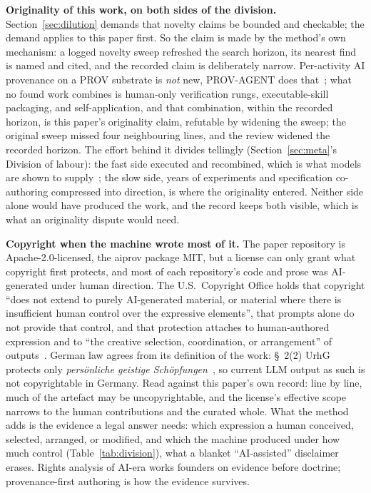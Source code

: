 \textbf{Originality of this work, on both sides of the division.}
Section~\ref{sec:dilution} demands that novelty claims be bounded and
checkable; the demand applies to this paper first. So the claim is
made by the method's own mechanism: a logged novelty sweep refreshed
the search horizon, its nearest find is named and cited, and the
recorded claim is deliberately narrow. Per-activity AI provenance on
a PROV substrate is \emph{not} new, PROV-AGENT does
that~\cite{prov-agent2025}; what no found work combines is human-only
verification rungs, executable-skill packaging, and self-application,
and that combination, within the recorded horizon, is this paper's
originality claim, refutable by widening the sweep; the original sweep
missed four neighbouring lines, and the review widened the recorded horizon.
The effort behind it divides tellingly (Section~\ref{sec:meta}'s
Division of labour): the fast side executed and recombined, which is
what models are shown to supply~\cite{llm-homogenization2024}; the
slow side, years of experiments and specification co-authoring
compressed into direction, is where the originality entered. Neither
side alone would have produced the work, and the record keeps both
visible, which is what an originality dispute would need.

\textbf{Copyright when the machine wrote most of it.} The paper
repository is Apache-2.0-licensed, the aiprov package MIT, but a
license can only grant what copyright first protects, and most of
each repository's code and prose was AI-generated under human
direction. The U.S.\ Copyright Office holds that copyright ``does not
extend to purely AI-generated material, or material where there is
insufficient human control over the expressive elements'', that
prompts alone do not provide that control, and that protection
attaches to human-authored expression and to ``the creative
selection, coordination, or arrangement'' of
outputs~\cite{usco-ai-copyrightability2025}. German law agrees from
its definition of the work: \S~2(2) UrhG protects only
\emph{pers\"onliche geistige Sch\"opfungen}~\cite{urhg-para2}, so
current LLM output as such is not copyrightable in Germany. Read
against this paper's own record: line by line, much of the artefact
may be uncopyrightable, and the license's effective scope narrows to
the human contributions and the curated whole. What the method adds
is the evidence a legal answer needs: which expression a human
conceived, selected, arranged, or modified, and which the machine
produced under how much control (Table~\ref{tab:division}), what a
blanket ``AI-assisted'' disclaimer erases. Rights analysis of AI-era
works founders on evidence before doctrine; provenance-first
authoring is how the evidence survives.

